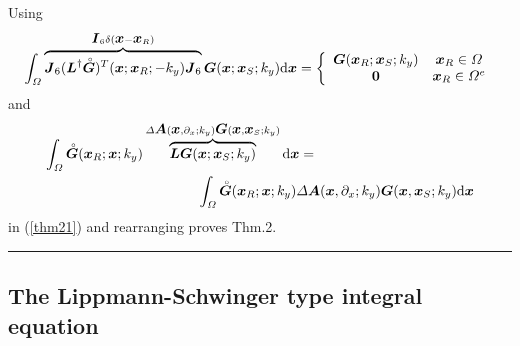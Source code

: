 Using 
\[
\int_{{\mit \Omega}} \overbrace{{\bmi J}_{6} ({\bmi L}^{\dagger}{\rf{\bmi G}})^{T}(
{\bmi x};{\bmi x}_{R};-k_y){\bmi J}_{6}}^{{\bmi I}_{6}\delta({\bmi x}-{\bmi 
x}_R)}{{\bmi G}}({\bmi 
x};{\bmi x}_{S};k_y) {\rm d}{\bmi x}=\left\{
\begin{array}{cc}
{{\bmi G}}({\bmi x}_{R};{\bmi x}_{S};k_y)& {\bmi x}_{R}\in {\mit \Omega}\\
{\bf 0}&{\bmi x}_{R}\in {\mit \Omega}^{e}
\end{array}  \right.
\]
and
\begin{eqnarray*}
\lefteqn{
\int_{{\mit \Omega}} {\rf{\bmi G}}({\bmi x}_{R};{\bmi x};k_y)
\overbrace{{\bmi L}{{\bmi G}}({\bmi x};{\bmi x}_{S};k_y)}^{{\mit \Delta} {\bmi A}({\bmi
x},\partial_{x};k_y) {\bmi G}({\bmi x},{\bmi x}_{S};k_y)} {\rm d}{\bmi 
x}=}\\
&&\qquad\qquad\qquad\qquad\qquad
\int_{{\mit \Omega}} {\rf{\bmi G}}({\bmi x}_{R};{\bmi x};k_y)
{\mit \Delta} {\bmi A}({\bmi
x},\partial_{x};k_y) {\bmi G}({\bmi x},{\bmi x}_{S};k_y) {\rm d}{\bmi x}
\end{eqnarray*}
in (\ref{thm21}) and rearranging proves Thm.2.
\hfill \rule{11 pt}{11 pt}



\subsection{The Lippmann-Schwinger type integral equation} \label{secLS}

